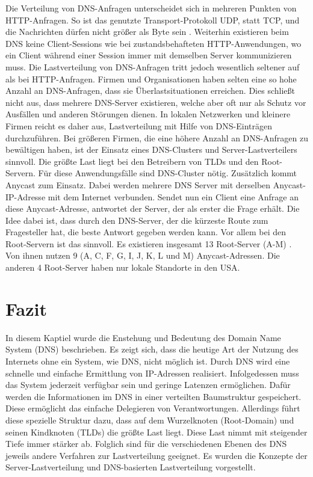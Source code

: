 \documentclass[a4paper, 12pt, BCOR10mm, DIV12, toc=bibliography, toc=listof, german]{scrbook}
\def \dns {Domain Name System (DNS)}
\begin{document}
			Die Verteilung von DNS-Anfragen unterscheidet sich in mehreren Punkten von HTTP-Anfragen. So
			ist das genutzte Transport-Protokoll UDP, statt TCP, und die Nachrichten dürfen nicht größer als
			\unit[512]{Byte} sein \cite{rfc1035}. Weiterhin existieren beim DNS keine Client-Sessions wie bei
			zustandsbehafteten HTTP-Anwendungen, wo ein Client während einer Session immer mit demselben Server
			kommunizieren muss. Die Lastverteilung von DNS-Anfragen tritt jedoch wesentlich seltener auf
			als bei HTTP-Anfragen. Firmen und Organisationen haben selten eine so hohe Anzahl an
			DNS-Anfragen, dass sie Überlastsituationen erreichen. Dies schließt nicht aus, dass mehrere
			DNS-Server existieren, welche aber oft nur als Schutz vor Ausfällen und anderen Störungen
			dienen.  In lokalen Netzwerken und kleinere Firmen reicht es daher aus, Lastverteilung mit Hilfe
			von DNS-Einträgen durchzuführen. Bei größeren Firmen, die eine höhere Anzahl an DNS-Anfragen
			zu bewältigen haben, ist der Einsatz eines DNS-Clusters und Server-Lastverteilers sinnvoll. Die
			größte Last liegt bei den Betreibern von TLDs und den Root-Servern. Für diese Anwendungsfälle
			sind DNS-Cluster nötig. Zusätzlich kommt Anycast \cite{rfc4786, sapate2005} zum Einsatz. Dabei
			werden mehrere DNS Server mit derselben Anycast-IP-Adresse mit dem Internet verbunden. Sendet
			nun ein Client eine Anfrage an diese Anycast-Adresse, antwortet der Server, der als erster die
			Frage erhält. Die Idee dabei ist, dass durch den DNS-Server, der die kürzeste Route zum
			Fragesteller hat, die beste Antwort gegeben werden kann. Vor allem bei den Root-Servern ist
			das sinnvoll. Es existieren insgesamt 13 Root-Server
			(A-M) \cite{rootserver}. Von ihnen nutzen 9 (A, C, F, G, I, J, K, L und M)
			Anycast-Adressen. Die anderen 4 Root-Server haben nur lokale Standorte in den USA.
				


		\section{Fazit} %
		\label{sec:grundlagen-fazit}

			In diesem Kaptiel wurde die Enstehung und Bedeutung des \dns{} beschrieben. Es zeigt sich,
			dass die heutige Art der Nutzung des Internets ohne ein System, wie DNS, nicht möglich ist.
			Durch DNS wird eine schnelle und einfache Ermittlung von IP-Adressen realisiert. Infolgedessen
			muss das System jederzeit verfügbar sein und geringe Latenzen ermöglichen. Dafür werden die
			Informationen im DNS in einer verteilten Baumstruktur gespeichert. Diese ermöglicht das
			einfache Delegieren von Verantwortungen. Allerdings führt diese spezielle Struktur dazu, dass
			auf dem Wurzelknoten (Root-Domain) und seinen Kindknoten (TLDs) die größte Last liegt. Diese
			Last nimmt mit steigender Tiefe immer stärker ab. Folglich sind für die verschiedenen Ebenen
			des DNS jeweils andere Verfahren zur Lastverteilung geeignet. Es wurden die Konzepte der
			Server-Lastverteilung und DNS-basierten Lastverteilung vorgestellt.
\end{document}
